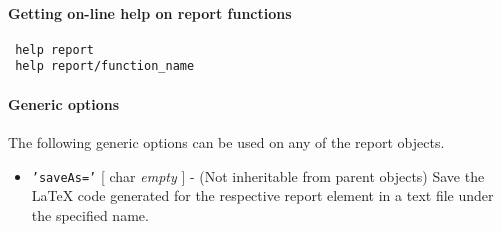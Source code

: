  \paragraph{Getting on-line help on report functions}
 
 \begin{verbatim}
 help report
 help report/function_name
 \end{verbatim}
 
 \paragraph{Generic options}
 
 The following generic options can be used on any of the report objects.
 
 \begin{itemize}
 \item
   \texttt{'saveAs='} {[} char \textbar{} \emph{empty} {]} - (Not
   inheritable from parent objects) Save the LaTeX code generated for the
   respective report element in a text file under the specified name.
 \end{itemize}



